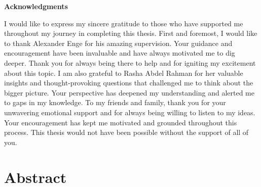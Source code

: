 \documentclass[
  doc,12pt,floatsintext]{apa7}
\begin{document}
\clearpage

\mbox{}\thispagestyle{empty}\clearpage

\newpage

\thispagestyle{empty}

\vspace*{55mm}

\begin{center}\textbf{Acknowledgments}\end{center}

I would like to express my sincere gratitude to those who have supported me throughout my journey in completing this thesis.
First and foremost, I would like to thank Alexander Enge for his amazing supervision. Your guidance and encouragement have been invaluable and have always motivated me to dig deeper. Thank you for always being there to help and for igniting my excitement about this topic.
I am also grateful to Rasha Abdel Rahman for her valuable insights and thought-provoking questions that challenged me to think about the bigger picture. Your perspective has deepened my understanding and alerted me to gaps in my knowledge.
To my friends and family, thank you for your unwavering emotional support and for always being willing to listen to my ideas. Your encouragement has kept me motivated and grounded throughout this process.
This thesis would not have been possible without the support of all of you.

\clearpage

\mbox{}\thispagestyle{empty}\clearpage

\thispagestyle{empty}

\vspace*{10mm}

\begin{flushleft}
{
\tableofcontents
}
\end{flushleft}

\clearpage

\mbox{}\thispagestyle{empty}\clearpage

\newpage

\setcounter{page}{7}

\section*{Abstract}\label{abstract}
\end{document}
